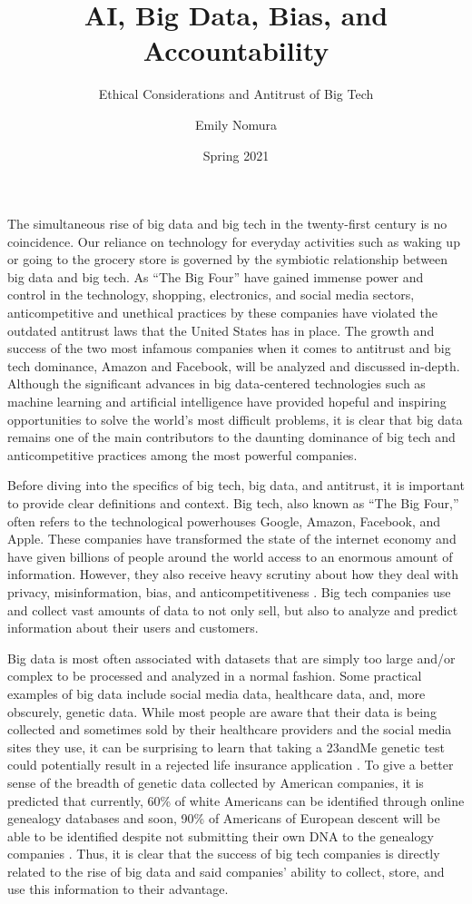 \documentclass[twoside]{article}
\title{AI, Big Data, Bias, and Accountability}
\subtitle{Ethical Considerations and Antitrust of Big Tech} %
\author{Emily Nomura}
\date{Spring 2021}
\begin{document}
\maketitle{}

The simultaneous rise of big data and big tech in the twenty-first century is no coincidence. Our reliance on technology for everyday activities such as waking up or going to the grocery store is governed by the symbiotic relationship between big data and big tech. As “The Big Four” have gained immense power and control in the technology, shopping, electronics, and social media sectors, anticompetitive and unethical practices by these companies have violated the outdated antitrust laws that the United States has in place. The growth and success of the two most infamous companies when it comes to antitrust and big tech dominance, Amazon and Facebook, will be analyzed and discussed in-depth. Although the significant advances in big data-centered technologies such as machine learning and artificial intelligence have provided hopeful and inspiring opportunities to solve the world’s most difficult problems, it is clear that big data remains one of the main contributors to the daunting dominance of big tech and anticompetitive practices among the most powerful companies. 

Before diving into the specifics of big tech, big data, and antitrust, it is important to provide clear definitions and context. Big tech, also known as “The Big Four,” often refers to the technological powerhouses Google, Amazon, Facebook, and Apple. These companies have transformed the state of the internet economy and have given billions of people around the world access to an enormous amount of information. However, they also receive heavy scrutiny about how they deal with privacy, misinformation, bias, and anticompetitiveness \cite{antitrust}. Big tech companies use and collect vast amounts of data to not only sell, but also to analyze and predict information about their users and customers.

Big data is most often associated with datasets that are simply too large and/or complex to be processed and analyzed in a normal fashion. Some practical examples of big data include social media data, healthcare data, and, more obscurely, genetic data. While most people are aware that their data is being collected and sometimes sold by their healthcare providers and the social media sites they use, it can be surprising to learn that taking a 23andMe genetic test could potentially result in a rejected life insurance application \cite{genetic}. To give a better sense of the breadth of genetic data collected by American companies, it is predicted that currently, 60\% of white Americans can be identified through online genealogy databases and soon, 90\% of Americans of European descent will be able to be identified despite not submitting their own DNA to the genealogy companies \cite{napkin}. Thus, it is clear that the success of big tech companies is directly related to the rise of big data and said companies’ ability to collect, store, and use this information to their advantage.
\end{document}
